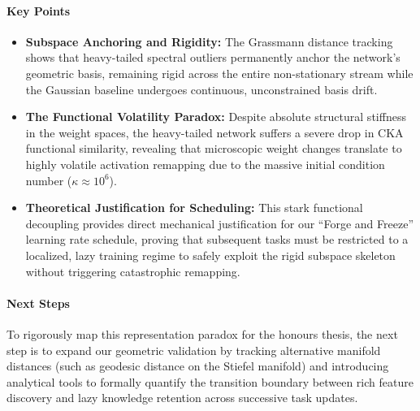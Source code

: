 \documentclass[10pt,a4paper]{article}
\begin{document}
	\paragraph{Key Points}
	\begin{itemize}
		\item \textbf{Subspace Anchoring and Rigidity:} The Grassmann distance tracking shows that heavy-tailed spectral outliers permanently anchor the network's geometric basis, remaining rigid across the entire non-stationary stream while the Gaussian baseline undergoes continuous, unconstrained basis drift.
		\item \textbf{The Functional Volatility Paradox:} Despite absolute structural stiffness in the weight spaces, the heavy-tailed network suffers a severe drop in CKA functional similarity, revealing that microscopic weight changes translate to highly volatile activation remapping due to the massive initial condition number ($\kappa \approx 10^6$).
		\item \textbf{Theoretical Justification for Scheduling:} This stark functional decoupling provides direct mechanical justification for our ``Forge and Freeze'' learning rate schedule, proving that subsequent tasks must be restricted to a localized, lazy training regime to safely exploit the rigid subspace skeleton without triggering catastrophic remapping.
	\end{itemize}
	
	\paragraph{Next Steps}
	To rigorously map this representation paradox for the honours thesis, the next step is to expand our geometric validation by tracking alternative manifold distances (such as geodesic distance on the Stiefel manifold) and introducing analytical tools to formally quantify the transition boundary between rich feature discovery and lazy knowledge retention across successive task updates.
	\newpage
\end{document}

